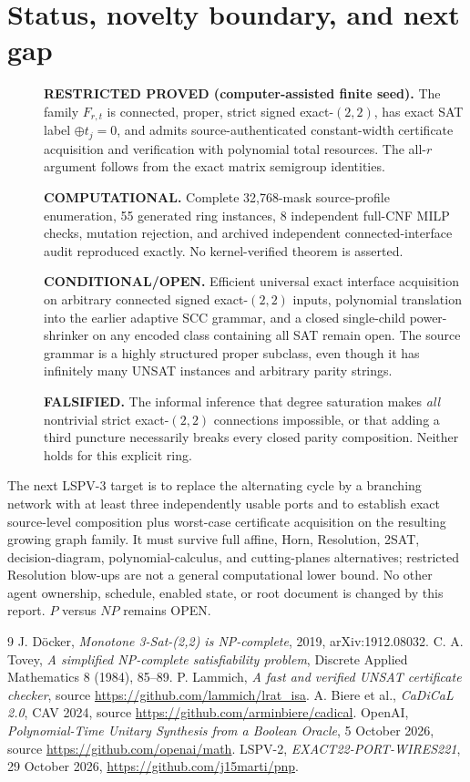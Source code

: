 \documentclass[11pt]{article}
\begin{document}
\section{Status, novelty boundary, and next gap}
\begin{description}
\item[]\textbf{RESTRICTED PROVED (computer-assisted finite seed).} The family $F_{r,t}$ is connected, proper, strict signed exact-$(2,2)$, has exact SAT label $\oplus t_j=0$, and admits source-authenticated constant-width certificate acquisition and verification with polynomial total resources. The all-$r$ argument follows from the exact matrix semigroup identities.
\item[]\textbf{COMPUTATIONAL.} Complete 32,768-mask source-profile enumeration, 55 generated ring instances, 8 independent full-CNF MILP checks, mutation rejection, and archived independent connected-interface audit reproduced exactly. No kernel-verified theorem is asserted.
\item[]\textbf{CONDITIONAL/OPEN.} Efficient universal exact interface acquisition on arbitrary connected signed exact-$(2,2)$ inputs, polynomial translation into the earlier adaptive SCC grammar, and a closed single-child power-shrinker on any encoded class containing all SAT remain open. The source grammar is a highly structured proper subclass, even though it has infinitely many UNSAT instances and arbitrary parity strings.
\item[]\textbf{FALSIFIED.} The informal inference that degree saturation makes \emph{all} nontrivial strict exact-$(2,2)$ connections impossible, or that adding a third puncture necessarily breaks every closed parity composition. Neither holds for this explicit ring.
\end{description}

The next LSPV-3 target is to replace the alternating cycle by a branching network with at least three independently usable ports and to establish exact source-level composition plus worst-case certificate acquisition on the resulting growing graph family. It must survive full affine, Horn, Resolution, 2SAT, decision-diagram, polynomial-calculus, and cutting-planes alternatives; restricted Resolution blow-ups are not a general computational lower bound. No other agent ownership, schedule, enabled state, or root document is changed by this report. $P$ versus $NP$ remains OPEN.


\begin{thebibliography}{9}
 J. D\"ocker, \emph{Monotone 3-Sat-(2,2) is NP-complete}, 2019, arXiv:1912.08032.
 C. A. Tovey, \emph{A simplified NP-complete satisfiability problem}, Discrete Applied Mathematics 8 (1984), 85--89.
 P. Lammich, \emph{A fast and verified UNSAT certificate checker}, source \url{https://github.com/lammich/lrat_isa}.
 A. Biere et al., \emph{CaDiCaL 2.0}, CAV 2024, source \url{https://github.com/arminbiere/cadical}.
 OpenAI, \emph{Polynomial-Time Unitary Synthesis from a Boolean Oracle}, 5 October 2026, source \url{https://github.com/openai/math}.
 LSPV-2, \emph{EXACT22-PORT-WIRES221}, 29 October 2026, \url{https://github.com/j15marti/pnp}.
\end{thebibliography}
\end{document}
